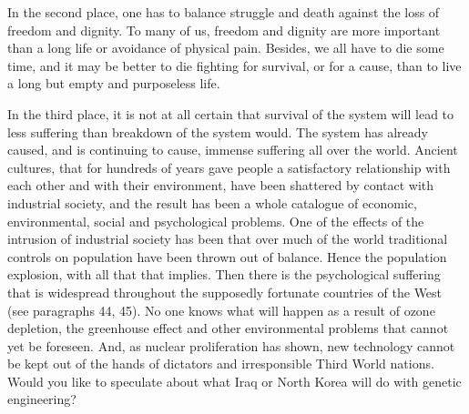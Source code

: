  In the second place, one has to balance struggle and death against the loss of freedom and dignity. To many of us, freedom and dignity are more important than a long life or avoidance of physical pain. Besides, we all have to die some time, and it may be better to die fighting for survival, or for a cause, than to live a long but empty and purposeless life.

 In the third place, it is not at all certain that survival of the system will lead to less suffering than breakdown of the system would. The system has already caused, and is continuing to cause, immense suffering all over the world. Ancient cultures, that for hundreds of years gave people a satisfactory relationship with each other and with their environment, have been shattered by contact with industrial society, and the result has been a whole catalogue of economic, environmental, social and psychological problems. One of the effects of the intrusion of industrial society has been that over much of the world traditional controls on population have been thrown out of balance. Hence the population explosion, with all that that implies. Then there is the psychological suffering that is widespread throughout the supposedly fortunate countries of the West (see paragraphs 44, 45). No one knows what will happen as a result of ozone depletion, the greenhouse effect and other environmental problems that cannot yet be foreseen. And, as nuclear proliferation has shown, new technology cannot be kept out of the hands of dictators and irresponsible Third World nations. Would you like to speculate about what Iraq or North Korea will do with genetic engineering?

